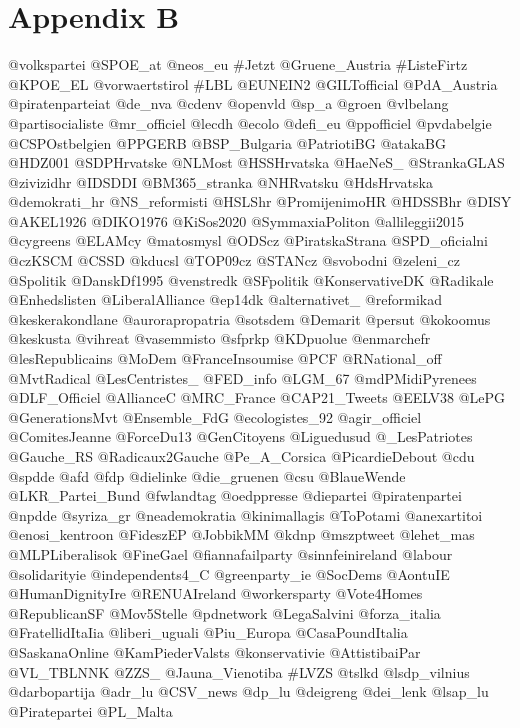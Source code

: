 \section{Appendix B}\label{appendix-b}\thispagestyle{SectionFirstPage} %
\setcounter{figure}{0}
\setcounter{table}{0}
\obeylines
\begin{multicols}{3}
{\tiny
@volkspartei
@SPOE\_at
@neos\_eu
\#Jetzt
@Gruene\_Austria
\#ListeFirtz
@KPOE\_EL
@vorwaertstirol
\#LBL
@EUNEIN2
@GILTofficial
@PdA\_Austria
@piratenparteiat
@de\_nva
@cdenv
@openvld
@sp\_a
@groen
@vlbelang
@partisocialiste
@mr\_officiel
@lecdh
@ecolo
@defi\_eu
@ppofficiel
@pvdabelgie
@CSPOstbelgien
@PPGERB
@BSP\_Bulgaria
@PatriotiBG
@atakaBG
@HDZ001
@SDPHrvatske
@NLMost
@HSSHrvatska
@HaeNeS\_
@StrankaGLAS
@zivizidhr
@IDSDDI
@BM365\_stranka
@NHRvatsku
@HdsHrvatska
@demokrati\_hr
@NS\_reformisti
@HSLShr
@PromijenimoHR
@HDSSBhr
@DISY
@AKEL1926
@DIKO1976
@KiSos2020
@SymmaxiaPoliton
@allileggii2015
@cygreens
@ELAMcy
@matosmysl
@ODScz
@PiratskaStrana
@SPD\_oficialni
@czKSCM
@CSSD
@kducsl
@TOP09cz
@STANcz
@svobodni
@zeleni\_cz
@Spolitik
@DanskDf1995
@venstredk
@SFpolitik
@KonservativeDK
@Radikale
@Enhedslisten
@LiberalAlliance
@ep14dk
@alternativet\_
@reformikad
@keskerakondlane
@aurorapropatria
@sotsdem
@Demarit
@persut
@kokoomus
@keskusta
@vihreat
@vasemmisto
@sfprkp
@KDpuolue
@enmarchefr
@lesRepublicains
@MoDem
@FranceInsoumise
@PCF
@RNational\_off
@MvtRadical
@LesCentristes\_
@FED\_info
@LGM\_67
@mdPMidiPyrenees
@DLF\_Officiel
@AllianceC
@MRC\_France
@CAP21\_Tweets
@EELV38
@LePG
@GenerationsMvt
@Ensemble\_FdG
@ecologistes\_92
@agir\_officiel
@ComitesJeanne
@ForceDu13
@GenCitoyens
@Liguedusud
@\_LesPatriotes
@Gauche\_RS
@Radicaux2Gauche
@Pe\_A\_Corsica
@PicardieDebout
@cdu
@spdde
@afd
@fdp
@dielinke
@die\_gruenen
@csu
@BlaueWende
@LKR\_Partei\_Bund
@fwlandtag
@oedppresse
@diepartei
@piratenpartei
@npdde
@syriza\_gr
@neademokratia
@kinimallagis
@ToPotami
@anexartitoi
@enosi\_kentroon
@FideszEP
@JobbikMM
@kdnp
@mszptweet
@lehet\_mas
@MLPLiberalisok
@FineGael
@fiannafailparty
@sinnfeinireland
@labour
@solidarityie
@independents4\_C
@greenparty\_ie
@SocDems
@AontuIE
@HumanDignityIre
@RENUAIreland
@workersparty
@Vote4Homes
@RepublicanSF
@Mov5Stelle
@pdnetwork
@LegaSalvini
@forza\_italia
@FratellidItaIia
@liberi\_uguali
@Piu\_Europa
@CasaPoundItalia
@SaskanaOnline
@KamPiederValsts
@konservativie
@AttistibaiPar
@VL\_TBLNNK
@ZZS\_
@Jauna\_Vienotiba
\#LVZS
@tslkd
@lsdp\_vilnius
@darbopartija
@adr\_lu
@CSV\_news
@dp\_lu
@deigreng
@dei\_lenk
@lsap\_lu
@Piratepartei
@PL\_Malta
}
\end{multicols}
